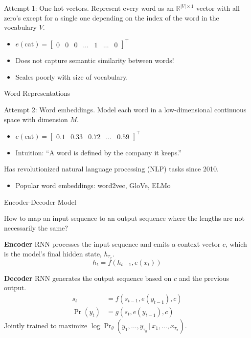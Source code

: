 \documentclass[english]{article}
\begin{document}
Attempt 1: One-hot vectors. Represent every word as an $\mathbb{R}^{|V|\times 1}$ vector with all zero's except for a single one depending on the index of the word in the vocabulary $V$.
\begin{itemize}
\item $e(\text{cat})=\left[\begin{smallmatrix}
0 & 0 & 0 & \dots & 1 & \dots & 0
\end{smallmatrix}\right]^\top$
\item Does not capture semantic similarity between words!
\item Scales poorly with size of vocabulary.
\end{itemize}
 

\item 
 {Word Representations}

Attempt 2: Word embeddings. Model each word in a low-dimensional continuous space with dimension $M$.
\begin{itemize}
\item $e(\text{cat})=\left[\begin{smallmatrix}
0.1 & 0.33 & 0.72 & \dots & 0.59
\end{smallmatrix}\right]^\top$
\item Intuition: ``A word is defined by the company it keeps.''
\end{itemize}
\vspace{5mm}
Has revolutionized natural language processing (NLP) tasks since 2010.
\begin{itemize}
\item Popular word embeddings: word2vec, GloVe, ELMo
\end{itemize}
 

\item 
 {Encoder-Decoder Model}

How to map an input sequence to an output sequence where the lengths are not necessarily the same?
 
\textbf{Encoder} RNN processes the input sequence and emits a context vector $c$, which is the model's final hidden state, $h_{\tau_x}$.
$$h_t = f(h_{t-1},e(x_t))$$

\textbf{Decoder} RNN generates the output sequence based on $c$ and the previous output.
\begin{align*}
s_t &= f(s_{t-1}, e(y_{t-1}), c)\\
\Pr(y_t) &= g(s_t, e(y_{t-1}), c)
\end{align*}
Jointly trained to maximize $\log{\Pr_\theta(y_1,\dots,y_{\tau_y}\,|\,x_1,\dots,x_{\tau_x})}$.
 
\end{document}
